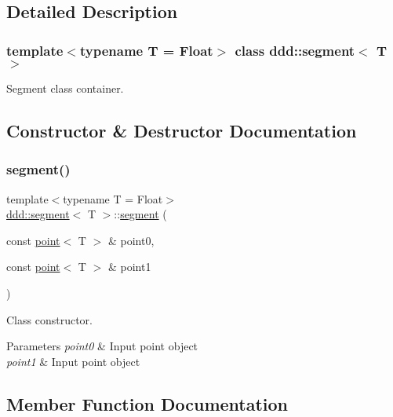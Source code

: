 \subsection{Detailed Description}
\subsubsection*{template$<$typename T = Float$>$\newline
class ddd\+::segment$<$ T $>$}

Segment class container. 

\subsection{Constructor \& Destructor Documentation}
\mbox{\label{classddd_1_1segment_afdfcc983efc30b3dee0af2603795775b}} 
\subsubsection{\texorpdfstring{segment()}{segment()}}
{\footnotesize\ttfamily template$<$typename T = Float$>$ \\
\hyperlink{classddd_1_1segment}{ddd\+::segment}$<$ T $>$\+::\hyperlink{classddd_1_1segment}{segment} (\begin{DoxyParamCaption}\item[{const \hyperlink{classddd_1_1point}{point}$<$ T $>$ \&}]{point0,  }\item[{const \hyperlink{classddd_1_1point}{point}$<$ T $>$ \&}]{point1 }\end{DoxyParamCaption})\hspace{0.3cm}{\ttfamily [inline]}}



Class constructor. 


\begin{DoxyParams}{Parameters}
{\em point0} & Input point object \\
\hline
{\em point1} & Input point object \\
\hline
\end{DoxyParams}


\subsection{Member Function Documentation}
\mbox{\label{classddd_1_1segment_a87c35ebcb1818d0958e51868a60c4181}} 
